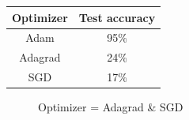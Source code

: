 \documentclass{article}
\begin{document}
\begin{center}
	\label{tab-4}
	\begin{tabular}{cc}
		\toprule
		Optimizer & Test accuracy \\
		\midrule
		Adam & 95\% \\
		Adagrad & 24\% \\
		SGD & 17\% \\
		\bottomrule
	\end{tabular}
\end{center}

\begin{figure}
	\centering
	\caption{Optimizer = Adagrad \& SGD}
	\label{fig-5}
\end{figure}
\end{document}
